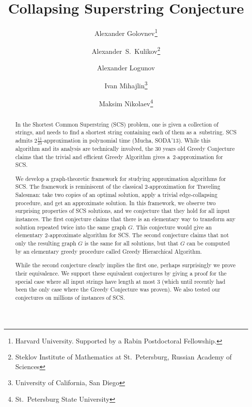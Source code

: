 \documentclass[11pt]{article}
\begin{document}

\sloppy
\begin{titlepage}
\title{Collapsing Superstring Conjecture}
\author{
Alexander Golovnev\thanks{Harvard University. Supported by a Rabin Postdoctoral Fellowship.}
\and
Alexander~S.~Kulikov\thanks{Steklov Institute of Mathematics at St.~Petersburg, Russian Academy of Sciences}
\and
Alexander Logunov\footnotemark[2]
\and
Ivan Mihajlin\thanks{University of California, San Diego}
\and 
Maksim Nikolaev\thanks{St.~Petersburg State University}
}
\maketitle
\thispagestyle{empty}

\begin{abstract}
In the Shortest Common Superstring (SCS) problem, one is given a collection of strings, and needs to find a shortest string containing each of them as a~substring. SCS admits $2\frac{11}{23}$-approximation in polynomial time (Mucha, SODA'13). While this algorithm and its analysis are technically involved, the $30$ years old Greedy Conjecture claims that the trivial and efficient Greedy Algorithm gives a~$2$-approximation for SCS. %

We develop a graph-theoretic framework for studying approximation algorithms for SCS. The framework is reminiscent of the classical 2-approximation for Traveling Salesman: take two copies of an optimal solution, apply a trivial edge-collapsing procedure, and get an approximate solution. In this framework, we observe two surprising properties of SCS solutions, and we conjecture that they hold for all input instances. The first conjecture claims that there is an elementary way to transform any solution repeated twice into the same graph $G$. This conjecture would give an elementary 2-approximate algorithm for SCS. The second conjecture claims that not only the resulting graph $G$ is the same for all solutions, but that $G$ can be computed by an elementary greedy procedure called Greedy Hierarchical Algorithm.

While the second conjecture clearly implies the first one, perhaps surprisingly we prove their equivalence. We support these equivalent conjectures by giving a proof for the special case where all input strings have length at most $3$ (which until recently had been the only case where the Greedy Conjecture was proven). We also tested our conjectures on millions of instances of SCS.


\end{abstract}
\end{titlepage}
\end{document}
